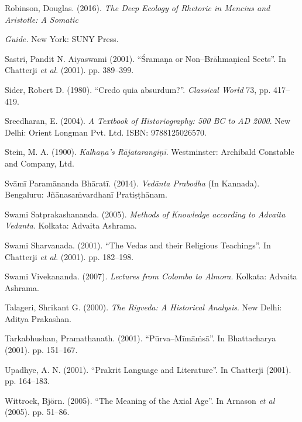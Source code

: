\begin{thebibliography}{99}
  Robinson, Douglas. (2016). \textit{The Deep Ecology of Rhetoric in Mencius and Aristotle: A Somatic }

  \textit{ Guide. }New York: SUNY Press.

  Sastri, Pandit N. Aiyaswami (2001). “Śramaṇa or Non–Brāhmaṇical Sects”. In Chatterji \textit{et al}. (2001). pp. 389–399.

  Sider, Robert D. (1980). “Credo quia absurdum?”. \textit{Classical World} 73, pp. 417–419.

  Sreedharan, E. (2004). \textit{A Textbook of Historiography: 500 BC to AD 2000}. New Delhi: Orient Longman Pvt. Ltd. ISBN: 9788125026570.

  Stein, M. A. (1900). \textit{Kalhaṇa’s Rājatarangiṇī}. Westminster: Archibald Constable and Company, Ltd.

  Svāmī Paramānanda Bhāratī. (2014). \textit{Vedānta Prabodha} (In Kannada). Bengaluru: Jñānasaṁvardhanī Pratiṣṭhānam.

  Swami Satprakashananda. (2005). \textit{Methods of Knowledge according to Advaita Vedanta}. Kolkata: Advaita Ashrama.

  Swami Sharvanada. (2001). “The Vedas and their Religious Teachings”. In Chatterji \textit{et al}. (2001). pp. 182–198.

  Swami Vivekananda. (2007). \textit{Lectures from Colombo to Almora}. Kolkata: Advaita Ashrama.

  Talageri, Shrikant G. (2000). \textit{The Rigveda: A Historical Analysis}. New Delhi: Aditya Prakashan.

  Tarkabhushan, Pramathanath. (2001). “Pūrva–Mīmāṁsā”. In Bhattacharya (2001). pp. 151–167.

  Upadhye, A. N. (2001). “Prakrit Language and Literature”. In Chatterji (2001). pp. 164–183.

  Wittrock, Björn. (2005). “The Meaning of the Axial Age”. In Arnason \textit{et al} (2005). pp. 51–86.

 \end{thebibliography}

